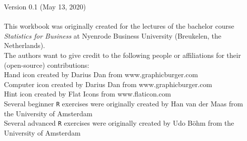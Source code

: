 \thispagestyle{emptyhead}

\vspace*{\fill} 

{\fontsize{8}{10}\selectfont

Version 0.1 (May 13, 2020) \\
\\
This workbook was originally created for the lectures of the bachelor course \textit{Statistics for Business} at Nyenrode Business University (Breukelen, the Netherlands). \\

The authors want to give credit to the following people or affiliations for their (open-source) contributions: \\

Hand icon created by Darius Dan from www.graphicburger.com \\
Computer icon created by Darius Dan from www.graphicburger.com \\
Hint icon created by Flat Icons from www.flaticon.com \\
Several beginner \texttt{R} exercises were originally created by Han van der Maas from the University of Amsterdam \\
Several advanced \texttt{R} exercises were originally created by Udo B{\"o}hm from the University of Amsterdam

}

\clearpage %
